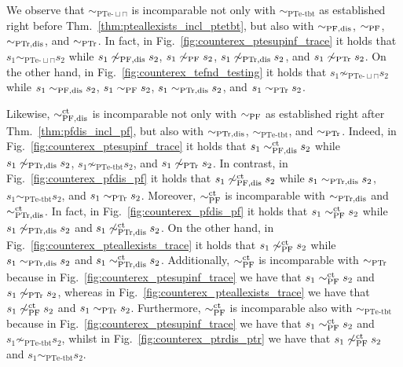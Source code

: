 \documentclass{LMCS}
\newcommand{\sbis}[1]
	{\sim_{#1}}
\begin{document}
We observe that $\sbis{\textrm{PTe-}\sqcup\sqcap}$ is incomparable not only with $\sbis{\textrm{PTe-tbt}}$
as established right before Thm.~\ref{thm:pteallexists_incl_ptetbt}, but also with $\sbis{\rm PF,dis}$,
$\sbis{\rm PF}$, $\sbis{\rm PTr,dis}$, and $\sbis{\rm PTr}$. In fact, in
Fig.~\ref{fig:counterex_ptesupinf_trace} it holds that $s_{1} \sbis{\textrm{PTe-}\sqcup\sqcap} s_{2}$ while
$s_{1} \not\sbis{\rm PF,dis} s_{2}$, $s_{1} \not\sbis{\rm PF} s_{2}$, $s_{1} \not\sbis{\rm PTr,dis} s_{2}$,
and $s_{1} \not\sbis{\rm PTr} s_{2}$. On the other hand, in Fig.~\ref{fig:counterex_tefnd_testing} it holds
that $s_{1} \not\sbis{\textrm{PTe-}\sqcup\sqcap} s_{2}$ while $s_{1} \sbis{\rm PF,dis} s_{2}$, $s_{1}
\sbis{\rm PF} s_{2}$, $s_{1} \sbis{\rm PTr,dis} s_{2}$, and $s_{1} \sbis{\rm PTr} s_{2}$.

Likewise, $\sbis{\rm PF,dis}^{\rm ct}$ is incomparable not only with $\sbis{\rm PF}$ as established right
after Thm.~\ref{thm:pfdis_incl_pf}, but also with $\sbis{\rm PTr,dis}$, $\sbis{\textrm{PTe-tbt}}$, and
$\sbis{\rm PTr}$. Indeed, in Fig.~\ref{fig:counterex_ptesupinf_trace} it holds that $s_{1} \sbis{\rm
PF,dis}^{\rm ct} s_{2}$ while $s_{1} \not\sbis{\rm PTr,dis} s_{2}$, $s_{1} \not\sbis{\textrm{PTe-tbt}}
s_{2}$, and $s_{1} \not\sbis{\rm PTr} s_{2}$. In contrast, in Fig.~\ref{fig:counterex_pfdis_pf} it holds
that $s_{1} \not\sbis{\rm PF,dis}^{\rm ct} s_{2}$ while $s_{1} \sbis{\rm PTr,dis} s_{2}$, $s_{1}
\sbis{\textrm{PTe-tbt}} s_{2}$, and $s_{1} \sbis{\rm PTr} s_{2}$. Moreover, $\sbis{\rm PF}^{\rm ct}$ is
incomparable with $\sbis{\rm PTr,dis}$ and $\sbis{\rm PTr,dis}^{\rm ct}$. In fact, in
Fig.~\ref{fig:counterex_pfdis_pf} it holds that $s_{1} \sbis{\rm PF}^{\rm ct} s_{2}$ while $s_{1}
\not\sbis{\rm PTr,dis} s_{2}$ and $s_{1} \not\sbis{\rm PTr,dis}^{\rm ct} s_{2}$. On the other hand, in
Fig.~\ref{fig:counterex_pteallexists_trace} it holds that $s_{1} \not\sbis{\rm PF}^{\rm ct} s_{2}$ while
$s_{1} \sbis{\rm PTr,dis} s_{2}$ and $s_{1} \sbis{\rm PTr,dis}^{\rm ct} s_{2}$. Additionally, $\sbis{\rm
PF}^{\rm ct}$ is incomparable with $\sbis{\rm PTr}$ because in Fig.~\ref{fig:counterex_ptesupinf_trace} we
have that $s_{1} \sbis{\rm PF}^{\rm ct} s_{2}$ and $s_{1} \not\sbis{\rm PTr} s_{2}$, whereas in
Fig.~\ref{fig:counterex_pteallexists_trace} we have that $s_{1} \not\sbis{\rm PF}^{\rm ct} s_{2}$ and $s_{1}
\sbis{\rm PTr} s_{2}$. Furthermore, $\sbis{\rm PF}^{\rm ct}$ is incomparable also with
$\sbis{\textrm{PTe-tbt}}$ because in Fig.~\ref{fig:counterex_ptesupinf_trace} we have that $s_{1} \sbis{\rm
PF}^{\rm ct} s_{2}$ and $s_{1} \not\sbis{\textrm{PTe-tbt}} s_{2}$, whilst in
Fig.~\ref{fig:counterex_ptrdis_ptr} we have that $s_{1} \not\sbis{\rm PF}^{\rm ct} s_{2}$ and $s_{1}
\sbis{\textrm{PTe-tbt}} s_{2}$.
\end{document}
